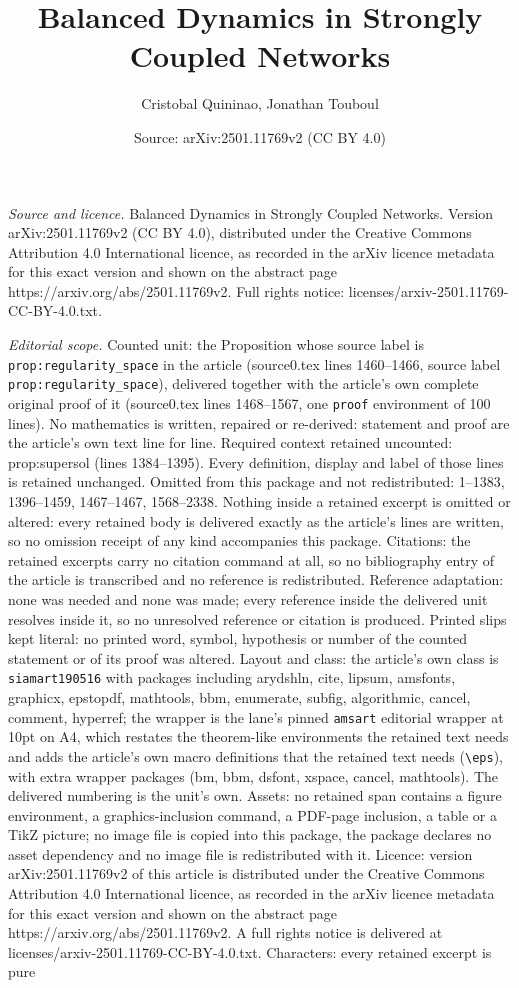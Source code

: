 \documentclass[10pt,a4paper]{amsart}
\title[Balanced Dynamics in Strongly Coupled Networks]{Balanced Dynamics in Strongly Coupled Networks}
\author{Cristobal Quininao, Jonathan Touboul}
\date{Source: arXiv:2501.11769v2 (CC BY 4.0)}
\begin{document}
\maketitle

\noindent\emph{Source and licence.} Balanced Dynamics in Strongly Coupled Networks. Version arXiv:2501.11769v2 (CC BY 4.0), distributed under the Creative Commons Attribution 4.0 International licence, as recorded in the arXiv licence metadata for this exact version and shown on the abstract page https://arxiv.org/abs/2501.11769v2. Full rights notice: licenses/arxiv-2501.11769-CC-BY-4.0.txt.\par\smallskip

\noindent\textit{Editorial scope.} Counted unit: the Proposition whose source label is \texttt{prop:regularity\_space} in the article (source0.tex lines 1460--1466, source label \texttt{prop:regularity\_space}), delivered together with the article's own complete original proof of it (source0.tex lines 1468--1567, one \texttt{proof} environment of 100 lines). No mathematics is written, repaired or re-derived: statement and proof are the article's own text line for line. Required context retained uncounted: prop:supersol (lines 1384--1395). Every definition, display and label of those lines is retained unchanged. Omitted from this package and not redistributed: 1--1383, 1396--1459, 1467--1467, 1568--2338. Nothing inside a retained excerpt is omitted or altered: every retained body is delivered exactly as the article's lines are written, so no omission receipt of any kind accompanies this package. Citations: the retained excerpts carry no citation command at all, so no bibliography entry of the article is transcribed and no reference is redistributed. Reference adaptation: none was needed and none was made; every reference inside the delivered unit resolves inside it, so no unresolved reference or citation is produced. Printed slips kept literal: no printed word, symbol, hypothesis or number of the counted statement or of its proof was altered. Layout and class: the article's own class is \texttt{siamart190516} with packages including arydshln, cite, lipsum, amsfonts, graphicx, epstopdf, mathtools, bbm, enumerate, subfig, algorithmic, cancel, comment, hyperref; the wrapper is the lane's pinned \texttt{amsart} editorial wrapper at 10pt on A4, which restates the theorem-like environments the retained text needs and adds the article's own macro definitions that the retained text needs (\texttt{\textbackslash eps}), with extra wrapper packages (bm, bbm, dsfont, xspace, cancel, mathtools). The delivered numbering is the unit's own. Assets: no retained span contains a figure environment, a graphics-inclusion command, a PDF-page inclusion, a table or a TikZ picture; no image file is copied into this package, the package declares no asset dependency and no image file is redistributed with it. Licence: version arXiv:2501.11769v2 of this article is distributed under the Creative Commons Attribution 4.0 International licence, as recorded in the arXiv licence metadata for this exact version and shown on the abstract page https://arxiv.org/abs/2501.11769v2. A full rights notice is delivered at licenses/arxiv-2501.11769-CC-BY-4.0.txt. Characters: every retained excerpt is pure 
\end{document}
